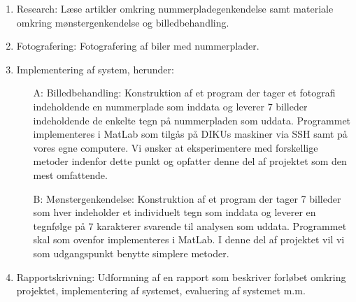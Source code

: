 \documentclass[12pt,a4paper,final]{report}
\begin{document}
\begin{enumerate}
\item Research: Læse artikler omkring nummerpladegenkendelse samt materiale omkring mønstergenkendelse og billedbehandling. %

\item Fotografering: Fotografering af biler med nummerplader. %


\item Implementering af system, herunder:

\begin{itemize}
\item[A:] Billedbehandling: Konstruktion af et program der tager et fotografi indeholdende en nummerplade som inddata og leverer 7 billeder indeholdende de enkelte tegn på nummerpladen som uddata. Programmet implementeres i MatLab som tilgås på DIKUs maskiner via SSH samt på vores egne computere. Vi ønsker at eksperimentere med forskellige metoder indenfor dette punkt og opfatter denne del af projektet som den mest omfattende.%

\item[B:] Mønstergenkendelse: Konstruktion af et program der tager 7 billeder som hver indeholder et individuelt tegn som inddata og leverer en tegnfølge på 7 karakterer svarende til analysen som uddata. Programmet skal som ovenfor implementeres i MatLab. I denne del af projektet vil vi som udgangspunkt benytte simplere metoder.%

\end{itemize}





\item Rapportskrivning: Udformning af en rapport som beskriver forløbet omkring projektet, implementering af systemet, evaluering af systemet m.m. %


\end{enumerate}
\end{document}
